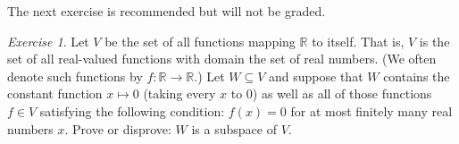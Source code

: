 \documentclass[fleqn,11pt]{paper}
\theoremstyle{remark}
\newtheorem*{exercise}{Exercise}
\newtheorem*{solution}{{\bf Solution}}
\newcommand\R{\fld{R}}
\newcommand{\<}{\ensuremath{\langle}}
\renewcommand{\>}{\ensuremath{\rangle}}
\newcommand\fld[1]{\ensuremath{\mathbb{#1}}}
\begin{document}
\newpage

\noindent The next exercise is recommended but will not be graded.
\begin{exercise}
Let $V$ be the set of all functions mapping $\R$ to itself.  That is, $V$ is the
set of all real-valued functions with domain the set of real numbers.
(We often denote such functions by $f:\R \to \R$.)
Let $W\subseteq V$ and suppose that $W$ contains the constant
function $x\mapsto 0$ (taking every $x$ to 0)
as well as all of those functions $f \in V$ satisfying the
following condition: $f(x) = 0$ for at most finitely many real numbers $x$.
Prove or disprove: $W$ is a subspace of $V$.
\end{exercise}
\end{document}
